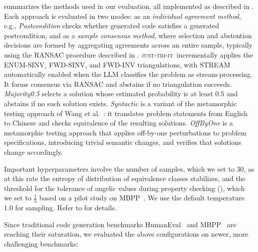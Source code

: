 \documentclass[acmsmall,screen,nonacm]{acmart}
\newcommand{\toolName}{\textsc{just-tri-it}\xspace}
\begin{document}
 summarizes the methods used in our evaluation, all implemented as described in . Each approach is evaluated in two modes: as an \emph{individual agreement method}, e.g., \emph{Postcondition} checks whether generated code satisfies a generated postcondition, and as a \emph{sample consensus method}, where selection and abstention decisions are formed by aggregating agreements across an entire sample, typically using the RANSAC procedure described in . \toolName\ incrementally applies the ENUM-SINV, FWD-SINV, and FWD-INV triangulations, with STREAM automatically enabled when the LLM classifies the problem as stream-processing. It forms consensus via RANSAC and abstains if no triangulation succeeds. \emph{Majority0.5} selects a solution whose estimated probability is at least $0.5$ and abstains if no such solution exists. \emph{Syntactic} is a variant of the metamorphic testing approach of Wang et al.~\cite{wang2024validating}: it translates problem statements from English to Chinese and checks equivalence of the resulting solutions. \emph{OffByOne} is a metamorphic testing approach that applies off-by-one perturbations to problem specifications, introducing trivial semantic changes, and verifies that solutions change accordingly.


Important hyperparameters involve the number of samples, which we set to 30, as at this rate the entropy of distribution of equivalence classes stabilizes, and the threshold for the tolerance of angelic values during property checking (), which we set to $\frac{1}{3}$ based on a pilot study on MBPP~\cite{austin2021program}. We use the default temperature 1.0 for sampling. Refer to  for details.


Since traditional code generation benchmarks HumanEval~\cite{chen2021evaluating} and MBPP~\cite{austin2021program} are reaching their saturation, we evaluated the above configurations on newer, more challenging benchmarks:
\end{document}
